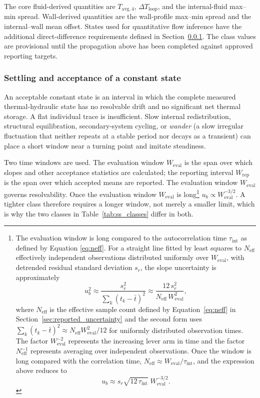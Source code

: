 \documentclass[11pt]{article}
\newcommand{\Tavg}{T_{\mathrm{avg},4}}
\begin{document}
The core fluid-derived quantities are $\Tavg$, $\Delta T_{\mathrm{loop}}$, and the internal-fluid max--min spread. Wall-derived quantities are the wall-profile max--min spread and the internal--wall mean offset. States used for quantitative flow inference have the additional direct-difference requirements defined in Section~\ref{sec:steady_criteria}. The class values are provisional until the propagation above has been completed against approved reporting targets.

\subsubsection{Settling and acceptance of a constant state}
\label{sec:steady_criteria}

An acceptable constant state is an interval in which the complete measured thermal-hydraulic state has no resolvable drift and no significant net thermal storage. A flat individual trace is insufficient. Slow internal redistribution, structural equilibration, secondary-system cycling, or \emph{wander} (a slow irregular fluctuation that neither repeats at a stable period nor decays as a transient) can place a short window near a turning point and imitate steadiness.

Two time windows are used. The evaluation window $W_{\mathrm{eval}}$ is the span over which slopes and other acceptance statistics are calculated; the reporting interval $W_{\mathrm{rep}}$ is the span over which accepted means are reported.  The evaluation window $W_{\mathrm{eval}}$ governs resolvability. Once the evaluation window $W_{\mathrm{eval}}$ is long\footnote{The evaluation window is long compared to the autocorrelation time $\tau_{\mathrm{int}}$ as defined by Equation \eqref{eq:neff}.   For a straight line fitted by least squares to $N_{\mathrm{eff}}$ effectively independent observations distributed uniformly over $W_{\mathrm{eval}}$, with detrended residual standard deviation $s_r$, the slope uncertainty is approximately
\begin{equation*}
    u_b^2
    \approx
    \frac{s_r^2}{\sum_k\left(t_k-\bar t\right)^2}
    \approx
    \frac{12\,s_r^2}{N_{\mathrm{eff}}\,W_{\mathrm{eval}}^2},
\end{equation*}
where $N_{\mathrm{eff}}$ is the effective sample count defined by Equation~\eqref{eq:neff} in Section~\ref{sec:reported_uncertainty} and the second form uses $\sum_k(t_k-\bar t)^2\approx N_{\mathrm{eff}}W_{\mathrm{eval}}^2/12$ for uniformly distributed observation times. The factor $W_{\mathrm{eval}}^{-2}$ represents the increasing lever arm in time and the factor $N_{\mathrm{eff}}^{-1}$ represents averaging over independent observations. Once the window is long compared with the correlation time, $N_{\mathrm{eff}}\approx W_{\mathrm{eval}}/\tau_{\mathrm{int}}$, and the expression above reduces to
\begin{equation*}
    u_b
    \approx
    s_r\sqrt{12\,\tau_{\mathrm{int}}}\;W_{\mathrm{eval}}^{-3/2}.
\end{equation*}
} $u_b\propto W_{\mathrm{eval}}^{-3/2}$. A tighter class therefore requires a longer window, not merely a smaller limit, which is why the two classes in Table~\ref{tab:ss_classes} differ in both.
\end{document}
